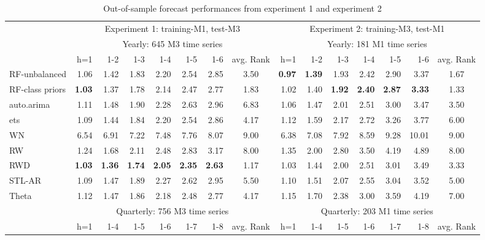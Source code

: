 \documentclass[11pt,a4paper,]{article}
\theoremstyle{definition}
\theoremstyle{definition}
\theoremstyle{definition}
\theoremstyle{remark}
\begin{document}
\begin{table}[!htbp]
\centering\tiny
\centering
\caption{Out-of-sample forecast performances from experiment 1 and experiment 2}
\label{masetab}
\begin{tabular}{lrrrrrrcrrrrrrc}
\hline
 & \multicolumn{7}{c}{Experiment 1: training-M1, test-M3} & \multicolumn{7}{c}{Experiment 2: training-M3, test-M1} \\ \cmidrule(lr){2-8} \cmidrule(lr){9-15}
 & \multicolumn{7}{c}{Yearly: 645 M3 time series} & \multicolumn{7}{c}{Yearly: 181 M1 time series} \\ 
 & h=1  & 1-2  &  1-3 & 1-4 & 1-5 & 1-6 & avg. Rank &  h=1 & 1-2  &  1-3 & 1-4 & 1-5 & 1-6 & avg. Rank\\ \cmidrule(lr){2-8} \cmidrule(lr){9-15}
RF-unbalanced &  1.06 & 1.42  & 1.83  & 2.20 &  2.54&2.85  &  3.50& \bf{0.97}  & \bf{1.39}  & 1.93  &2.42  &  2.90& 3.37 &1.67  \\ 
RF-class priors & \bf{1.03}  & 1.37  &  1.78 &  2.14& 2.47 &  2.77&  1.83&  1.02 &  1.40 &  \bf{1.92} & \bf{2.40} & \bf{2.87} & \bf{3.33} & 1.33 \\ 
auto.arima &  1.11 &  1.48 &  1.90 &  2.28& 2.63 &2.96  & 6.83 &  1.06 &  1.47 &  2.01 &  2.51&3.00  &3.47  & 3.50 \\ 
ets & 1.09  & 1.44  & 1.84  & 2.20 &  2.54& 2.86 &  4.17& 1.12  & 1.59
&2.17   &2.72  &3.26  & 3.77 &  6.00\\ 
WN &  6.54 &  6.91 &  7.22 &  7.48& 7.76 &8.07  &9.00  &  6.38 &  7.08 &  7.92 &8.59  &9.28  &  10.01&  9.00\\ 
RW & 1.24  &  1.68 &  2.11 &  2.48& 2.83 &  3.17&8.00  &  1.35 &  2.00 &  2.80 &  3.50& 4.19 &  4.89& 8.00 \\ 
RWD & \bf{1.03}  &  \bf{1.36} & \bf{1.74}  &  \bf{2.05}&  \bf{2.35}&  \bf{2.63}&1.17  & 1.03  &  1.44 & 2.00  & 2.51 &  3.01& 3.49 &  3.33\\ 
STL-AR & 1.09  &  1.47 &  1.89 &  2.27& 2.62 &  2.95& 5.50 & 1.10  &  1.51 &  2.07 &  2.55& 3.04 & 3.52 & 5.00 \\ 
Theta & 1.12  & 1.47  & 1.86  & 2.18 &  2.48&  2.77&  4.17& 1.15  & 1.70  & 2.38  & 3.00 &  3.59& 4.19 &  7.00\\ \cmidrule(lr){2-8} \cmidrule(lr){9-15}
 & \multicolumn{7}{c}{Quarterly: 756 M3 time series} & \multicolumn{7}{c}{Quarterly: 203 M1 time series} \\ 
  & h=1  & 1-4  &  1-5 & 1-6 & 1-7 & 1-8 & avg. Rank &  h=1 & 1-4  &  1-5 & 1-6 & 1-7 & 1-8 & avg. Rank\\ \cmidrule(lr){2-8} \cmidrule(lr){9-15}

\end{tabular}
\end{table}
\end{document}
